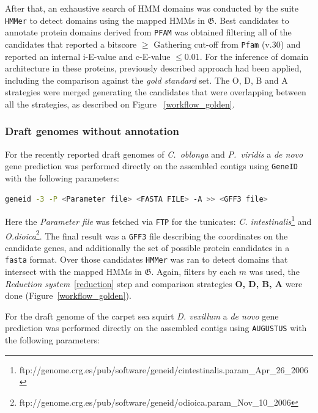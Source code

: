 \documentclass[11pt]{article}
\begin{document}
After that, an exhaustive search of HMM domains was conducted by the suite 
\texttt{HMMer} to detect domains using the mapped HMMs in 
$\boldsymbol{\mathfrak{G}}$. Best candidates to annotate protein domains 
derived from \texttt{PFAM} was obtained filtering all of the candidates that 
reported a bitscore $\geq$ Gathering cut-off from \texttt{Pfam} (v.30) and 
reported an internal i-E-value and c-E-value $\leq 0.01$. For the inference of 
domain architecture in these proteins, previously described approach had been 
applied, including the comparison against the \textsl{gold standard} set. The O, 
D, B and A strategies were merged generating the candidates that were 
overlapping between all the strategies, as described on Figure 
~\ref{workflow_golden}.

\subsubsection*{Draft genomes without annotation}

For the recently reported draft genomes of \textit{C.\ oblonga} and 
\textit{P.\ viridis} a \textit{de novo} gene prediction was performed 
directly on the assembled contigs using \texttt{GeneID}\cite{Blanco:2007} 
with the following parameters:

\begin{lstlisting}[language=bash, breaklines=true]
geneid -3 -P <Parameter file> <FASTA FILE> -A >> <GFF3 file>
\end{lstlisting}

Here the \textit{Parameter file} was fetched via \texttt{FTP} for the 
tunicates: \textsl{C. intestinalis}\footnote{
ftp://genome.crg.es/pub/software/geneid/cintestinalis.param\_Apr\_26\_2006} and 
\textsl{O.dioica}\footnote{
ftp://genome.crg.es/pub/software/geneid/odioica.param\_Nov\_10\_2006}. The final 
result was a \texttt{GFF3} file describing the coordinates on the candidate 
genes, and additionally the set of possible protein candidates in a 
\texttt{fasta} format. Over those candidates \texttt{HMMer} was ran to detect 
domains that intersect with the mapped HMMs in $\boldsymbol{\mathfrak{G}}$. 
Again, filters by each $m$ was used, the \textsl{Reduction 
system}~\ref{reduction} step and comparison strategies \textbf{O, D, B, A} were 
done (Figure~\ref{workflow_golden}).

For the draft genome of the carpet sea squirt \textit{D. vexillum} 
\cite{velandia2016a} a \textit{de novo} gene prediction was performed 
directly on the assembled contigs using \texttt{AUGUSTUS} \cite{augustus} 
with the following parameters:
\end{document}

